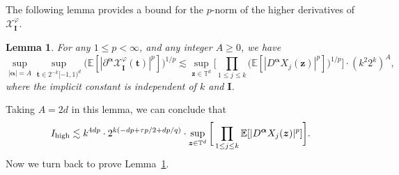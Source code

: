 \documentclass[12pt]{amsart}
\newtheorem{lemma}[theorem]{Lemma}
\theoremstyle{definition}
\theoremstyle{remark}
\newcommand{\bt}{\boldsymbol{t}}
\newcommand{\bz}{\boldsymbol{z}}
\newcommand{\E}{\mathbb{E}}
\newcommand{\T}{\mathbb{T}}
\numberwithin{equation}{section}
\begin{document}
The following lemma provides a bound for the $p$-norm of the higher derivatives of $\mathcal{X}_{\boldsymbol{I}}^\varphi$.
\begin{lemma}\label{lemma:p-norm-h-derivatives-of-XIphi}
For any $1\le p<\infty$, and any integer $A\ge 0$, we have
\[
\sup_{|\boldsymbol{\alpha}|=A}\sup_{\bt\in 2^{-k}[-1,1)^d}\big(\E[|\partial^{\boldsymbol{\alpha}}\mathcal{X}_{\boldsymbol{I}}^\varphi(\bt)|^p]\big)^{1/p}\lesssim \sup_{\bz\in \T^d}\bigg[\prod_{1\le j\le k}\big(\E[|D^{\boldsymbol{\alpha}}X_j(\bz)|^p]\big)^{1/p}\bigg]\cdot (k^2 2^k)^{A},
\]
where the implicit constant is independent of $k$ and $\boldsymbol{I}$.
\end{lemma}
Taking $A=2d$ in this lemma, we can conclude that
\begin{equation}\label{eq:bound-I-high}
I_{\textnormal{high}}\lesssim k^{4dp}\cdot 2^{k(-dp+\tau p/2+dp/q)}\cdot \sup_{\bz\in \T^d}\bigg[\prod_{1\le j\le k}\E[|D^{\boldsymbol{\alpha}}X_j(\bz)|^p]\bigg].
\end{equation}
Now we turn back to prove Lemma~\ref{lemma:p-norm-h-derivatives-of-XIphi}.
\end{document}

